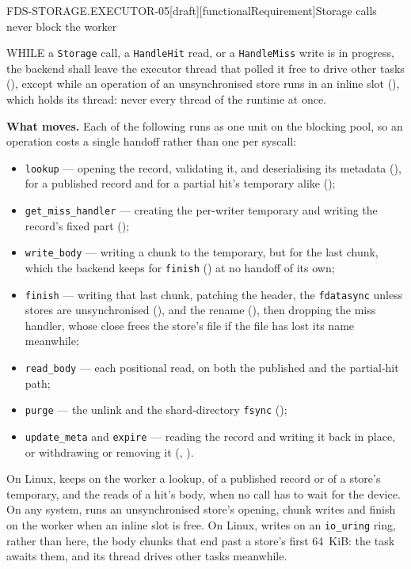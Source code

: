 \begin{requirement}{FDS-STORAGE.EXECUTOR-05}[draft][functionalRequirement]{Storage calls never block the worker}


  WHILE a \texttt{Storage} call, a \texttt{HandleHit} read, or a
  \texttt{HandleMiss} write is in progress, the backend shall leave the
  executor thread that polled it free to drive other tasks
  (), except while an operation of an
  unsynchronised store runs in an inline slot
  (), which holds its thread: never
  every thread of the runtime at once.

  \textbf{What moves.} Each of the following runs as one unit on the blocking
  pool, so an operation costs a single handoff rather than one per syscall:
  \begin{itemize}
    \item \texttt{lookup} --- opening the record, validating it, and
      deserialising its metadata (), for a
      published record and for a partial hit's temporary alike
      ();
    \item \texttt{get\_miss\_handler} --- creating the per-writer temporary
      and writing the record's fixed part ();
    \item \texttt{write\_body} --- writing a chunk to the temporary, but for
      the last chunk, which the backend keeps for \texttt{finish}
      () at no handoff of its own;
    \item \texttt{finish} --- writing that last chunk, patching the
      header, the \texttt{fdatasync} unless stores are unsynchronised
      (), and the rename
      (), then
      dropping the miss handler, whose close frees the store's file if the
      file has lost its name meanwhile;
    \item \texttt{read\_body} --- each positional read, on both the published
      and the partial-hit path;
    \item \texttt{purge} --- the unlink and the shard-directory
      \texttt{fsync} ();
    \item \texttt{update\_meta} and \texttt{expire} --- reading the record and
      writing it back in place, or withdrawing or removing it
      (, ).
  \end{itemize}
  On Linux,  keeps on the worker a lookup,
  of a published record or of a store's temporary, and the reads of a hit's
  body, when no call has to wait for the device. On any system,
   runs an unsynchronised store's
  opening, chunk writes and finish on the worker when an inline slot is
  free. On Linux,  writes on an
  \texttt{io\_uring} ring, rather than here, the body chunks that end past a
  store's first 64~KiB: the task awaits them, and its thread drives other
  tasks meanwhile.


\end{requirement}
